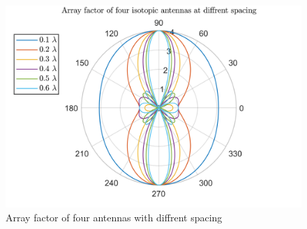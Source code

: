 \begin{figure}[H]
\centering 
\includegraphics[scale = 0.7]{figures/measurement/af_4ant.png}
\caption{Array factor of four antennas with diffrent spacing}
\label{fig:af_4ant}
\end{figure}






